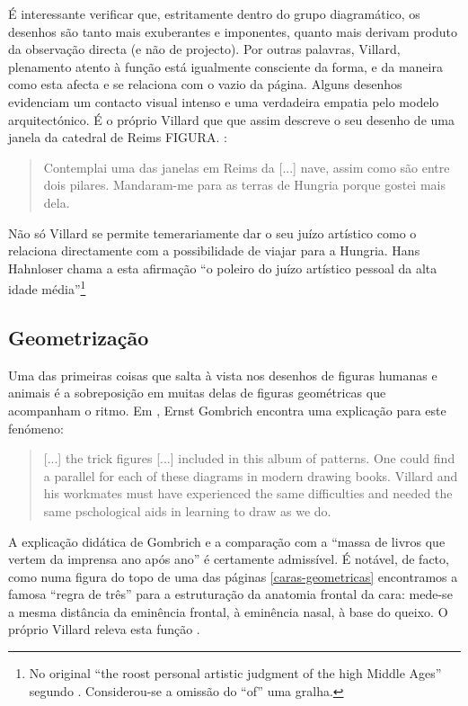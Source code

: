 \documentclass{article}
\begin{document}
É interessante verificar que, estritamente dentro do grupo
diagramático, os desenhos são tanto mais exuberantes e imponentes,
quanto mais derivam produto da observação directa (e não de
projecto). Por outras palavras, Villard, plenamento atento à função
está igualmente consciente da forma, e da maneira como esta afecta e
se relaciona com o vazio da página. Alguns desenhos evidenciam um
contacto visual intenso e uma verdadeira empatia pelo modelo
arquitectónico. É o próprio Villard que que assim descreve o seu
desenho de uma janela da catedral de Reims FIGURA. \cite{villard,
  p??}:

\begin{quote}
Contemplai uma das janelas em Reims da [...] nave, assim como são
entre dois pilares. Mandaram-me para as terras de Hungria porque
gostei mais dela. \cite[p. ??]{villard}
\end{quote}

Não só Villard se permite temerariamente dar o seu juízo artístico
como o relaciona directamente com a possibilidade de viajar para a
Hungria. Hans Hahnloser \cite[p. ??]{hahnloser} chama a esta afirmação
``o poleiro do juízo artístico pessoal da alta idade
média''\footnote{No original ``the roost personal artistic judgment of
  the high Middle Ages'' segundo \cite{teresa}. Considerou-se a
  omissão do ``of'' uma gralha.}

\subsection{Geometrização}

Uma das primeiras coisas que salta à vista nos desenhos de figuras
humanas e animais é a sobreposição em muitas delas de figuras
geométricas que acompanham o ritmo. Em \cite{gombrich, p130}, Ernst
Gombrich encontra uma explicação para este fenómeno:

\begin{quote}
  [...] the trick figures [...] included in this album of patterns. One
  could find a parallel for each of these diagrams in modern drawing
  books. Villard and his workmates must have experienced the same
  difficulties and needed the same pschological aids in learning to
  draw as we do.
\end{quote}

A explicação didática de Gombrich e a comparação com a ``massa de
livros que vertem da imprensa ano após ano'' \cite[p. 127]{gombrich} é
certamente admissível. É notável, de facto, como numa figura do topo
de uma das páginas \ref{caras-geometricas} encontramos a famosa
``regra de três'' para a estruturação da anatomia frontal da cara:
mede-se a mesma distância da eminência frontal, à eminência nasal, à
base do queixo. O próprio Villard releva esta função \cite[p. 18,
  verso]{villard}.
\end{document}

